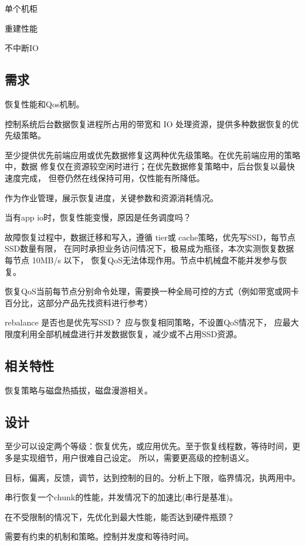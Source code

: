 单个机柜

重建性能

不中断IO

\subsection{需求}

恢复性能和Qos机制。

控制系统后台数据恢复进程所占用的带宽和 IO 处理资源，提供多种数据恢复的优先级策略。

至少提供优先前端应用或优先数据修复这两种优先级策略。在优先前端应用的策略中，数据
修复仅在资源较空闲时进行；在优先数据修复策略中，后台恢复以最快速度完成，
但卷仍然在线保持可用，仅性能有所降低。

作为作业管理，展示恢复进度，关键参数和资源消耗情况。

当有app io时，恢复性能变慢，原因是任务调度吗？

故障恢复过程中，数据迁移和写入，遵循 tier或 cache策略，优先写SSD，每节点SSD数量有限，
在同时承担业务访问情况下，极易成为瓶径，本次实测恢复数据每节点 10MB/s 以下，
恢复QoS无法体现作用。节点中机械盘不能并发参与恢复。

恢复QoS当前每节点分别命令处理，需要换一种全局可控的方式（例如带宽或网卡百分比，这部分产品先找资料进行参考）

rebalance 是否也是优先写SSD？ 应与恢复相同策略，不设置QoS情况下，
应最大限度利用全部机械盘进行并发数据恢复，减少或不占用SSD资源。

\subsection{相关特性}

恢复策略与磁盘热插拔，磁盘漫游相关。

\subsection{设计}

至少可以设定两个等级：恢复优先，或应用优先。至于恢复线程数，等待时间，更多是实现细节，用户很难自己设定。
所以，需要更高级的控制语义。

目标，偏离，反馈，调节，达到控制的目的。分析上下限，临界情况，执两用中。

串行恢复一个chunk的性能，并发情况下的加速比(串行是基准)。

在不受限制的情况下，先优化到最大性能，能否达到硬件瓶颈？

需要有约束的机制和策略。控制并发度和等待时间。

